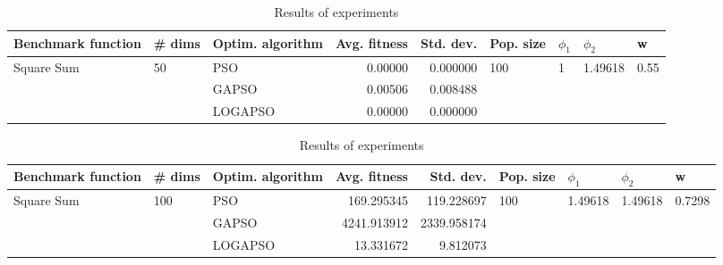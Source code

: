 \documentclass{article}
\begin{document}
\begin{table}
\centering
\caption{Results of experiments}
\begin{tabular}{lllrrllll}
\toprule
         Benchmark function &             \# dims & Optim. algorithm &  Avg. fitness &  Std. dev. &            Pop. size &         $\phi_{1}$ &               $\phi_{2}$ &                     w \\
\midrule
\multirow{3}{*}{Square Sum} & \multirow{3}{*}{50} &              PSO &       0.00000 &   0.000000 & \multirow{3}{*}{100} & \multirow{3}{*}{1} & \multirow{3}{*}{1.49618} & \multirow{3}{*}{0.55} \\
                            &                     &            GAPSO &       0.00506 &   0.008488 &                      &                    &                          &                       \\
                            &                     &          LOGAPSO &       0.00000 &   0.000000 &                      &                    &                          &                       \\
\bottomrule
\end{tabular}
\end{table}
\begin{table}
\centering
\caption{Results of experiments}
\begin{tabular}{lllrrllll}
\toprule
         Benchmark function &              \# dims & Optim. algorithm &  Avg. fitness &   Std. dev. &            Pop. size &               $\phi_{1}$ &               $\phi_{2}$ &                       w \\
\midrule
\multirow{3}{*}{Square Sum} & \multirow{3}{*}{100} &              PSO &    169.295345 &  119.228697 & \multirow{3}{*}{100} & \multirow{3}{*}{1.49618} & \multirow{3}{*}{1.49618} & \multirow{3}{*}{0.7298} \\
                            &                      &            GAPSO &   4241.913912 & 2339.958174 &                      &                          &                          &                         \\
                            &                      &          LOGAPSO &     13.331672 &    9.812073 &                      &                          &                          &                         \\
\bottomrule
\end{tabular}
\end{table}
\end{document}
